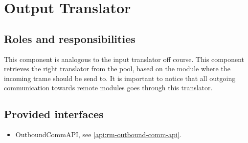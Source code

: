 \section{Output Translator}
\label{element:rm-output-translator}

\subsection{Roles and responsibilities}

\npar This component is analogous to the input translator off course. This
component retrieves the right translator from the pool, based on the module
where the incoming trame should be send to. It is important to notice that all
outgoing communication towards remote modules goes through this translator.

\subsection{Provided interfaces}

\begin{itemize}
  \item OutboundCommAPI, see \ref{api:rm-outbound-comm-api}.
\end{itemize}